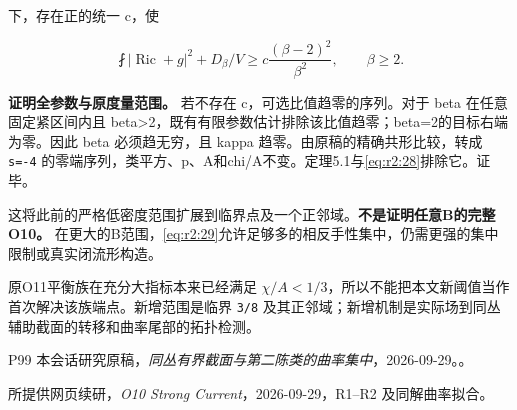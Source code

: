 \documentclass[UTF8,11pt,fontset=none]{ctexart}
\begin{document}
下，存在正的统一 c，使

\[
 \boxed{\fint|\operatorname{Ric}+g|^2+D_\beta/V
 \ge c\frac{(\beta-2)^2}{\beta^2},\qquad\beta\ge2.}
 \tag{2.31}\label{eq:r2:31}
\]

\textbf{证明全参数与原度量范围。} 若不存在 c，可选比值趋零的序列。对于 beta 在任意固定紧区间内且 beta\textgreater2，既有有限参数估计排除该比值趋零；beta=2的目标右端为零。因此 beta 必须趋无穷，且 kappa 趋零。由原稿的精确共形比较，转成 \texttt{s=-4} 的零端序列，类平方、p、A和chi/A不变。定理5.1与\eqref{eq:r2:28}排除它。证毕。

这将此前的严格低密度范围扩展到临界点及一个正邻域。\textbf{不是证明任意B的完整O10。} 在更大的B范围，\eqref{eq:r2:29}允许足够多的相反手性集中，仍需更强的集中限制或真实闭流形构造。

原O11平衡族在充分大指标本来已经满足 \(\chi/A<1/3\)，所以不能把本文新阈值当作首次解决该族端点。新增范围是临界 \texttt{3/8} 及其正邻域；新增机制是实际场到同丛辅助截面的转移和曲率尾部的拓扑检测。

\begin{thebibliography}{P99}
\small
{} 本会话研究原稿，\emph{同丛有界截面与第二陈类的曲率集中}，2026-09-29。。

 所提供网页续研，\emph{O10 Strong Current}，2026-09-29，R1--R2 及同解曲率拟合。

\end{thebibliography}
\end{document}
